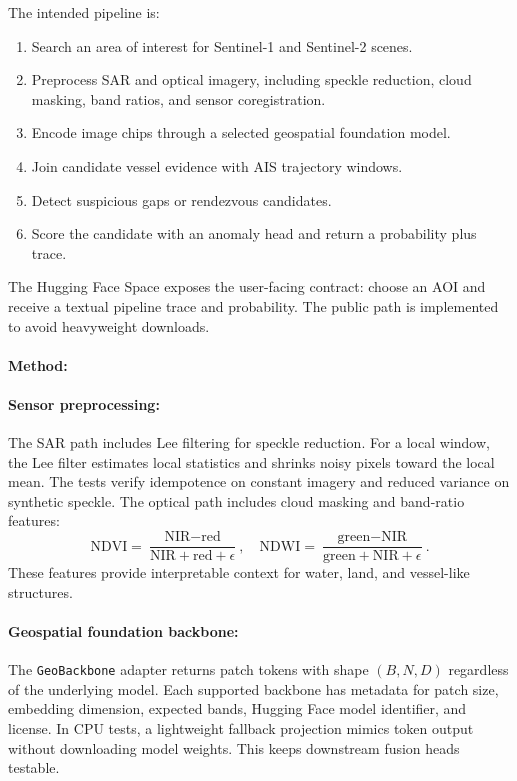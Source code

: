 \documentclass{article}
\begin{document}
The intended pipeline is:
\begin{enumerate}
  \item Search an area of interest for Sentinel-1 and Sentinel-2 scenes.
  \item Preprocess SAR and optical imagery, including speckle reduction, cloud masking, band ratios, and sensor coregistration.
  \item Encode image chips through a selected geospatial foundation model.
  \item Join candidate vessel evidence with AIS trajectory windows.
  \item Detect suspicious gaps or rendezvous candidates.
  \item Score the candidate with an anomaly head and return a probability plus trace.
\end{enumerate}

The Hugging Face Space exposes the user-facing contract: choose an AOI and receive a textual pipeline trace and probability. The public path is implemented to avoid heavyweight downloads.

\paragraph{Method:}

\paragraph{Sensor preprocessing:}

The SAR path includes Lee filtering for speckle reduction. For a local window, the Lee filter estimates local statistics and shrinks noisy pixels toward the local mean. The tests verify idempotence on constant imagery and reduced variance on synthetic speckle. The optical path includes cloud masking and band-ratio features:
\begin{equation}
  \text{NDVI}=\frac{\text{NIR}-\text{red}}{\text{NIR}+\text{red}+\epsilon}, \quad
  \text{NDWI}=\frac{\text{green}-\text{NIR}}{\text{green}+\text{NIR}+\epsilon}.
\end{equation}
These features provide interpretable context for water, land, and vessel-like structures.

\paragraph{Geospatial foundation backbone:}

The \texttt{GeoBackbone} adapter returns patch tokens with shape $(B,N,D)$ regardless of the underlying model. Each supported backbone has metadata for patch size, embedding dimension, expected bands, Hugging Face model identifier, and license. In CPU tests, a lightweight fallback projection mimics token output without downloading model weights. This keeps downstream fusion heads testable.
\end{document}
